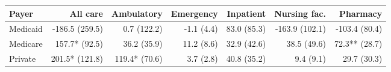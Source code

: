 \begin{tabular}{@{}l rrrrrr@{}}
\toprule
Payer & All care & Ambulatory & Emergency & Inpatient & Nursing fac. & Pharmacy \\
\midrule
Medicaid & -186.5 (259.5) & 0.7 (122.2) & -1.1 (4.4) & 83.0 (85.3) & -163.9 (102.1) & -103.4 (80.4) \\
Medicare & 157.7* (92.5) & 36.2 (35.9) & 11.2 (8.6) & 32.9 (42.6) & 38.5 (49.6) & 72.3** (28.7) \\
Private & 201.5* (121.8) & 119.4* (70.6) & 3.7 (2.8) & 40.8 (35.2) & 9.4 (9.1) & 29.7 (30.3) \\
\bottomrule
\end{tabular}
